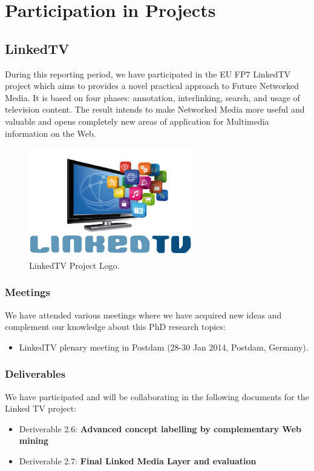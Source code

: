 \documentclass[a4paper,11pt]{report}
\begin{document}

\chapter{Participation in Projects}

\section{LinkedTV}
During this reporting period, we have participated in the EU FP7 LinkedTV project which aims to provides a novel practical approach to Future Networked Media. It is based on four phases: annotation, interlinking, search, and usage of television content. The result intends to make Networked Media more useful and valuable and opens completely new areas of application for Multimedia information on the Web.
\begin{figure} [h]
\centering
\includegraphics [scale=0.50] {figure/linkedtv_logo.png}
\caption{LinkedTV Project Logo.}
\label{fig:linkedtv_logo}
\end{figure}

\subsection*{Meetings}
We have attended various meetings where we have acquired new ideas and complement our knowledge about this PhD research topics:
\begin{itemize}
\item  LinkedTV plenary meeting in Postdam (28-30 Jan 2014, Postdam, Germany).
\end{itemize}

\subsection*{Deliverables}
We have participated and will be collaborating in the following documents for the Linked TV project:
\begin{itemize}
\item   Deriverable 2.6: \textbf{Advanced concept labelling by complementary Web mining}
\item   Deriverable 2.7: \textbf{Final Linked Media Layer and evaluation}
\end{itemize}
\end{document}
